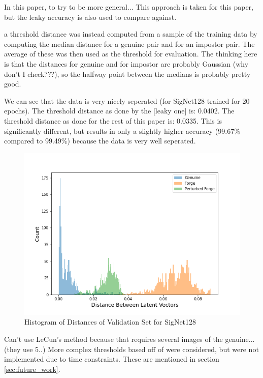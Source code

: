 In this paper, 
to try to be more general...
This approach is taken for this paper, but the leaky accuracy is also used to compare against.

a threshold distance was instead computed from a sample of the training data by computing the median distance for a genuine pair and for an impostor pair.
The average of these was then used as the threshold for evaluation.
The thinking here is that the distances for genuine and for impostor are probably Gaussian (why don't I check???), so the halfway point between the medians is probably pretty good.

We can see that the data is very nicely seperated (for SigNet128 trained for 20 epochs).
The threshold distance as done by the [leaky one] is: 0.0402.
The threshold distance as done for the rest of this paper is: 0.0335.
This is significantly different, but results in only a slightly higher accuracy (99.67\% compared to 99.49\%) because the data is very well seperated.
\begin{figure}[h]
    \begin{center}
        \includegraphics[width=0.8\linewidth]{distance_histogram_signet_128.png}
    \end{center}
    \caption{Histogram of Distances of Validation Set for SigNet128}
    \label{fig:hist_distances}
\end{figure}

Can't use LeCun's method because that requires several images of the genuine... (they use 5..)
More complex thresholds based off of \cite{LeCun} were considered, but were not implemented due to time constraints.
These are mentioned in section \ref{sec:future_work}.




